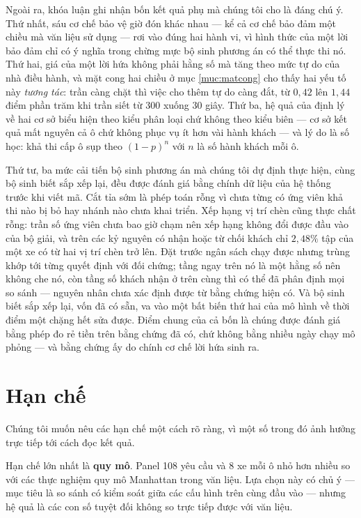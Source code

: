 Ngoài ra, khóa luận ghi nhận bốn kết quả phụ mà chúng tôi cho là đáng chú ý. Thứ nhất, sáu cơ
chế bảo vệ giờ đón khác nhau --- kể cả cơ chế bảo đảm một chiều mà văn liệu sử dụng --- rơi vào
đúng hai hành vi, vì hình thức của một lời bảo đảm chỉ có ý nghĩa trong chừng mực bộ sinh
phương án có thể thực thi nó. Thứ hai, giá của một lời hứa không phải hằng số mà tăng theo mức
tự do của nhà điều hành, và mặt cong hai chiều ở mục \ref{muc:matcong} cho thấy hai yếu tố này
\emph{tương tác}: trần càng chặt thì việc cho thêm tự do càng đắt, từ $0{,}42$ lên $1{,}44$
điểm phần trăm khi trần siết từ 300 xuống 30 giây. Thứ ba, hệ quả của định lý về hai cơ sở
biểu hiện theo kiểu phân loại chứ không theo kiểu biên --- cơ sở kết quả mất nguyên cả ô chứ
không phục vụ ít hơn vài hành khách --- và lý do là số học: khả thi cấp ô sụp theo $(1-p)^{n}$
với $n$ là số hành khách mỗi ô.

Thứ tư, ba mức cải tiến bộ sinh phương án mà chúng tôi dự định thực hiện, cùng bộ sinh biết sắp
xếp lại, đều được đánh giá bằng chính dữ liệu của hệ thống trước khi viết mã. Cắt tỉa sớm là phép
toán rỗng vì chưa từng có ứng viên khả thi nào bị bỏ hay nhánh nào chưa khai triển. Xếp hạng vị trí
chèn cũng thực chất rỗng: trần số ứng viên chưa bao giờ chạm nên xếp hạng không đổi được đầu vào
của bộ giải, và trên các kỷ nguyên có nhận hoặc từ chối khách chỉ $2{,}48\%$ tập của một xe có từ
hai vị trí chèn trở lên. Đặt trước ngân sách chạy được nhưng trùng khớp tới từng quyết định với đối
chứng; tầng ngay trên nó là một hằng số nên không che nó, còn tầng số khách nhận ở trên cùng thì có
thể đã phân định mọi so sánh --- nguyên nhân chưa xác định được từ bằng chứng hiện có. Và bộ sinh
biết sắp xếp lại, vốn đã có sẵn, va vào một bất biến thứ hai của mô hình về thời điểm một chặng hết
sửa được. Điểm chung của cả bốn là chúng được đánh giá
bằng phép đo rẻ tiền trên bằng chứng đã có, chứ không bằng nhiều ngày chạy mô phỏng --- và bằng
chứng ấy do chính cơ chế lời hứa sinh ra.

\section{Hạn chế}

Chúng tôi muốn nêu các hạn chế một cách rõ ràng, vì một số trong đó ảnh hưởng trực tiếp tới
cách đọc kết quả.

Hạn chế lớn nhất là \textbf{quy mô}. Panel 108 yêu cầu và 8 xe mỗi ô nhỏ hơn nhiều so với các
thực nghiệm quy mô Manhattan trong văn liệu. Lựa chọn này có chủ ý --- mục tiêu là so sánh có
kiểm soát giữa các cấu hình trên cùng đầu vào --- nhưng hệ quả là các con số tuyệt đối không so
trực tiếp được với văn liệu.

